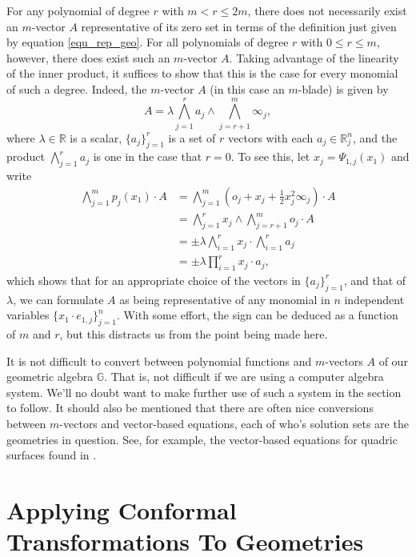 \documentclass{ecgd-l}
\theoremstyle{definition}
\theoremstyle{remark}
\numberwithin{equation}{section}
\newcommand{\G}{\mathbb{G}}
\newcommand{\R}{\mathbb{R}}
\newcommand{\nvai}{\infty}
\newcommand{\nvao}{o}
\begin{document}
For any polynomial of degree $r$ with $m<r\leq 2m$, there does not necessarily exist an $m$-vector $A$ representative of its zero set in terms of the definition just given by
equation \eqref{equ_rep_geo}.  For all polynomials of degree $r$ with $0\leq r\leq m$,
however,
there does exist such an $m$-vector $A$.  Taking advantage of the linearity of the inner product,
it suffices to show that this is the case for every monomial of such a degree.  Indeed, the $m$-vector
$A$ (in this case an $m$-blade) is given by
\begin{equation*}
A = \lambda\bigwedge_{j=1}^r a_j\wedge\bigwedge_{j=r+1}^m\nvai_j,
\end{equation*}
where $\lambda\in\R$ is a scalar, $\{a_j\}_{j=1}^r$ is a set of $r$ vectors with
each $a_j\in\R^n_j$,
and the product $\bigwedge_{j=1}^r a_j$ is one in the case that $r=0$.
To see this, let $x_j=\Psi_{1,j}(x_1)$ and write
\begin{align*}
\bigwedge_{j=1}^m p_j(x_1)\cdot A
 &= \bigwedge_{j=1}^m\left(\nvao_j+x_j+\frac{1}{2}x_j^2\nvai_j\right)\cdot A \\
 &= \bigwedge_{j=1}^r x_j\wedge\bigwedge_{j=r+1}^m\nvao_j\cdot A \\
 &= \pm\lambda\bigwedge_{i=1}^r x_j \cdot\bigwedge_{i=1}^r a_j \\
 &= \pm\lambda\prod_{i=1}^r x_j\cdot a_j,
\end{align*}
which shows that for an appropriate choice of the vectors in $\{a_j\}_{j=1}^r$,
and that of $\lambda$, we can formulate $A$ as being representative of any monomial in $n$
independent variables $\{x_1\cdot e_{1,j}\}_{j=1}^n$.  With some effort,
the sign can be deduced as a function of $m$ and $r$, but this distracts us
from the point being made here.

It is not difficult to convert between polynomial functions and $m$-vectors $A$
of our geometric algebra $\G$.  That is, not difficult if we are using a computer
algebra system.  We'll no doubt want to make further
use of such a system in the section to follow.  It should also be mentioned
that there are often nice conversions between $m$-vectors and vector-based
equations, each of who's solution sets are the geometries in question.  See, for example,
the vector-based equations for quadric surfaces found in \cite{Miller87}.

\section{Applying Conformal Transformations To Geometries}
\end{document}
